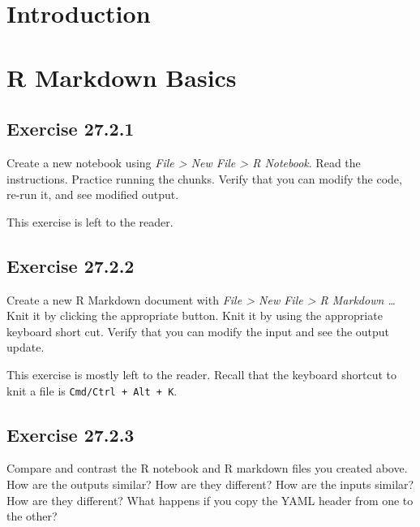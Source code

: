 \documentclass[]{book}
\theoremstyle{plain}
\theoremstyle{remark}
\begin{document}
\hypertarget{introduction-17}{%
\section{Introduction}\label{introduction-17}}

\hypertarget{r-markdown-basics}{%
\section{R Markdown Basics}\label{r-markdown-basics}}

\hypertarget{exercise-27.2.1}{%
\subsection*{\texorpdfstring{Exercise
{27.2.1}}{Exercise 27.2.1}}\label{exercise-27.2.1}}

Create a new notebook using \emph{File \textgreater{} New File
\textgreater{} R Notebook}. Read the instructions. Practice running the
chunks. Verify that you can modify the code, re-run it, and see modified
output.

This exercise is left to the reader.

\hypertarget{exercise-27.2.2}{%
\subsection*{\texorpdfstring{Exercise
{27.2.2}}{Exercise 27.2.2}}\label{exercise-27.2.2}}

Create a new R Markdown document with \emph{File \textgreater{} New File
\textgreater{} R Markdown \ldots{}} Knit it by clicking the appropriate
button. Knit it by using the appropriate keyboard short cut. Verify that
you can modify the input and see the output update.

This exercise is mostly left to the reader. Recall that the keyboard
shortcut to knit a file is \texttt{Cmd/Ctrl\ +\ Alt\ +\ K}.

\hypertarget{exercise-27.2.3}{%
\subsection*{\texorpdfstring{Exercise
{27.2.3}}{Exercise 27.2.3}}\label{exercise-27.2.3}}

Compare and contrast the R notebook and R markdown files you created
above. How are the outputs similar? How are they different? How are the
inputs similar? How are they different? What happens if you copy the
YAML header from one to the other?
\end{document}
